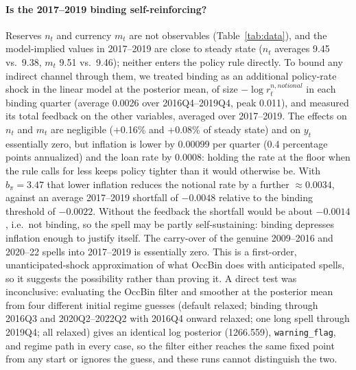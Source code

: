 \documentclass[11pt]{article}
\begin{document}
\paragraph{Is the 2017--2019 binding self-reinforcing?}
Reserves $n_t$ and currency $m_t$ are not observables (Table~\ref{tab:data}),
and the model-implied values in 2017--2019 are close to steady state
($n_t$ averages 9.45 vs.\ 9.38, $m_t$ 9.51 vs.\ 9.46); neither enters the
policy rule directly. To bound any indirect channel through them, we
treated binding as an additional policy-rate shock in the linear model at the posterior mean, of size
$-\log r^{n,notional}_t$ in each binding quarter (average 0.0026 over
2016Q4--2019Q4, peak 0.011), and measured its total feedback on the other
variables, averaged over 2017--2019. The effects on $n_t$ and $m_t$ are
negligible (+0.16\% and +0.08\% of steady state) and on $y_t$ essentially
zero, but inflation is lower by 0.00099 per quarter (0.4 percentage points
annualized) and the loan rate by 0.0008: holding the rate at the floor
when the rule calls for less keeps policy tighter than it would otherwise
be. With $b_\pi=3.47$ that lower inflation reduces the notional rate by a
further $\approx0.0034$, against an average 2017--2019 shortfall of
$-0.0048$ relative to the binding threshold of $-0.0022$. Without the
feedback the shortfall would be about $-0.0014$, i.e.\ not binding, so the
spell may be partly self-sustaining: binding depresses inflation enough to
justify itself. The carry-over of the genuine 2009--2016 and 2020--22
spells into 2017--2019 is essentially zero. This is a first-order,
unanticipated-shock approximation of what OccBin does with anticipated
spells, so it suggests the possibility rather than proving it. A direct
test was inconclusive: evaluating the OccBin filter and smoother at the
posterior mean from four different initial regime guesses (default
relaxed; binding through 2016Q3 and 2020Q2--2022Q2 with 2016Q4 onward
relaxed; one long spell through 2019Q4; all relaxed) gives an identical
log posterior (1266.559), \texttt{warning\_flag}, and regime path in every
case, so the filter either reaches the same fixed point from any start or
ignores the guess, and these runs cannot distinguish the two.
\end{document}
